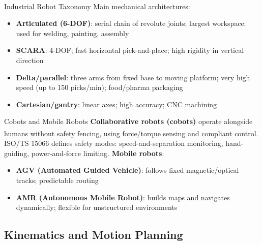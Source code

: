\begin{v3topic}{Industrial Robot Taxonomy}
    Main mechanical architectures\textsuperscript{\cite[][pp.~1--20]{sicilianoRobotics2009}}:
    \begin{itemize}
        \item \textbf{Articulated (6-DOF)}: serial chain of revolute joints; largest workspace; used for welding, painting, assembly
        \item \textbf{SCARA}: 4-DOF; fast horizontal pick-and-place; high rigidity in vertical direction
        \item \textbf{Delta/parallel}: three arms from fixed base to moving platform; very high speed (up to 150 picks/min); food/pharma packaging
        \item \textbf{Cartesian/gantry}: linear axes; high accuracy; CNC machining
    \end{itemize}

\end{v3topic}
\begin{v3topic}{Cobots and Mobile Robots}
    \textbf{Collaborative robots (cobots)} operate alongside humans without safety fencing, using force/torque sensing and compliant control\textsuperscript{\cite[][pp.~15--25]{benariElementsRobotics2017}}.
    ISO/TS 15066 defines safety modes: speed-and-separation monitoring, hand-guiding, power-and-force limiting.
    \textbf{Mobile robots}:
    \begin{itemize}
        \item \textbf{AGV (Automated Guided Vehicle)}: follows fixed magnetic/optical tracks; predictable routing
        \item \textbf{AMR (Autonomous Mobile Robot)}: builds maps and navigates dynamically; flexible for unstructured environments
    \end{itemize}
\end{v3topic}

\subsection{Kinematics and Motion Planning}

